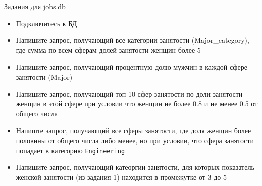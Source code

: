 \documentclass{beamer}
\begin{document}
\begin{frame}[fragile]{Задания для jobs.db}
	\begin{itemize}
		\item Подключитесь к БД
		\item Напишите запрос, получающий все категории занятости (Major\_category), где сумма по всем сферам долей занятости женщин более 5
		\item Напишите запрос, получающий процентную долю мужчин в каждой сфере занятости (Major)
		\item Напишите запрос, получающий топ-10 сфер занятости по доли занятости женщин в этой сфере при условии что женщин не более 0.8 и не менее 0.5 от общего числа
		\item Напиште запрос, получающий все сферы занятости, где доля женщин более половины от общего числа либо менее, но при условии, что сфера занятости попадает в категорию \texttt{Engineering}
		\item Напишите запрос, получающий катеоргии занятости, для которых показатель женской занятости (из задания 1) находится в промежутке от 3 до 5
	\end{itemize}
\end{frame}
\end{document}
